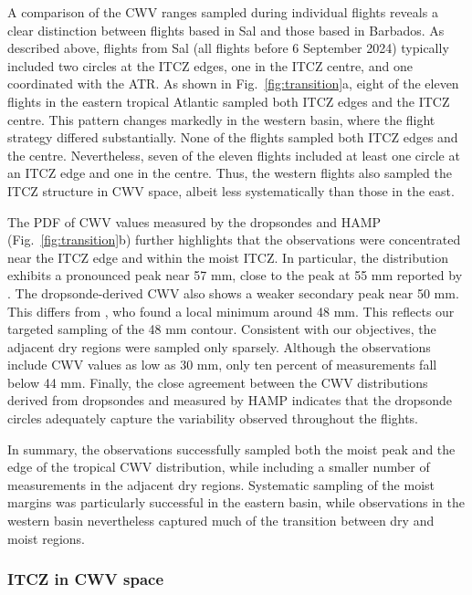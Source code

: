 \documentclass{article}
\begin{document}
A comparison of the CWV ranges sampled during individual flights reveals a clear distinction between flights based in Sal and those based in Barbados. As described above, flights from Sal (all flights before 6 September 2024) typically included two circles at the ITCZ edges, one in the ITCZ centre, and one coordinated with the ATR. As shown in Fig.~\ref{fig:transition}a, eight of the eleven flights in the eastern tropical Atlantic sampled both ITCZ edges and the ITCZ centre. This pattern changes markedly in the western basin, where the flight strategy differed substantially. None of the flights sampled both ITCZ edges and the centre. Nevertheless, seven of the eleven flights included at least one circle at an ITCZ edge and one in the centre. Thus, the western flights also sampled the ITCZ structure in CWV space, albeit less systematically than those in the east.

The PDF of CWV values measured by the dropsondes and HAMP (Fig.~\ref{fig:transition}b) further highlights that the observations were concentrated near the ITCZ edge and within the moist ITCZ. In particular, the distribution exhibits a pronounced peak near 57 mm, close to the peak at 55 mm reported by \cite{Mapes2018}. The dropsonde-derived CWV also shows a weaker secondary peak near 50 mm. This differs from \cite{Mapes2018}, who found a local minimum around 48 mm. This reflects our targeted sampling of the 48 mm contour. Consistent with our objectives, the adjacent dry regions were sampled only sparsely. Although the observations include CWV values as low as 30 mm, only ten percent of measurements fall below 44 mm. Finally, the close agreement between the CWV distributions derived from dropsondes and measured by HAMP indicates that the dropsonde circles adequately capture the variability observed throughout the flights.

In summary, the observations successfully sampled both the moist peak and the edge of the tropical CWV distribution, while including a smaller number of measurements in the adjacent dry regions. Systematic sampling of the moist margins was particularly successful in the eastern basin, while observations in the western basin nevertheless captured much of the transition between dry and moist regions.


\subsubsection{ITCZ in CWV space}

\end{document}
